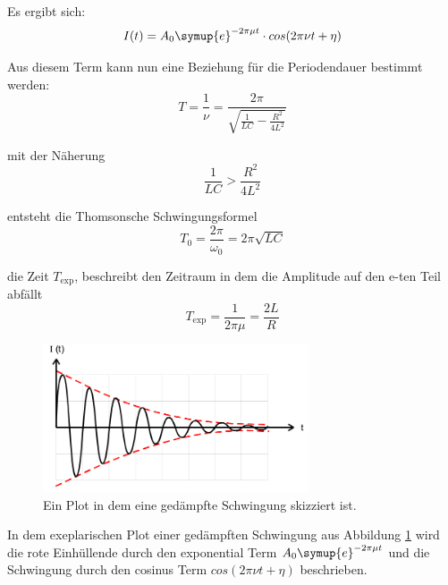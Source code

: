         \noindent Es ergibt sich:
        \begin{equation}
            I(t) = A_0 \symup{e}^{- 2 \pi \mu t} \cdot cos(2\pi \nu t + \eta) \nonumber
        \end{equation}

        \noindent Aus diesem Term kann nun eine Beziehung für die Periodendauer bestimmt werden:
        \begin{equation}
            T = \frac{1}{\nu} = \frac{2 \pi}{\sqrt{\frac{1}{LC}-\frac{R^2}{4L^2}}} \nonumber
        \end{equation}

        \noindent mit der Näherung
        \begin{equation}
            \frac{1}{LC} > \frac{R^2}{4L^2} \nonumber
        \end{equation}

        \noindent entsteht die Thomsonsche Schwingungsformel
        \begin{equation}
            T_0 = \frac{2\pi}{\omega_0} = 2\pi \sqrt{LC} \nonumber
        \end{equation}

        \noindent die Zeit $T_{\text{exp}}$, beschreibt den Zeitraum in dem die Amplitude auf den e-ten Teil abfällt
        \begin{equation}
            T_{\text{exp}} = \frac{1}{2 \pi \mu } = \frac{2L}{R} \nonumber
        \end{equation}

        \begin{figure}[H]
            \centering
            \includegraphics[width=0.7\textwidth]{images/ged.PNG}
            \caption{Ein Plot in dem eine gedämpfte Schwingung skizziert ist.}
            \label{img:gedSch}
        \end{figure}

        \noindent In dem exeplarischen Plot einer gedämpften Schwingung aus Abbildung \ref{img:gedSch} wird die rote Einhüllende durch den 
        exponential Term $A_0 \symup{e}^{- 2 \pi \mu t}$ und die Schwingung durch den cosinus Term $cos(2\pi \nu t + \eta)$ beschrieben.

